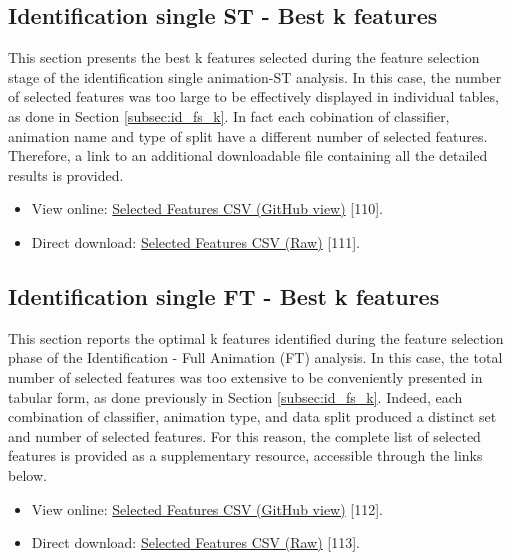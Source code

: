 \documentclass{article}
\begin{document}
\clearpage
\subsection{Identification single ST - Best k features}

This section presents the best k features selected during the feature selection stage of the identification single animation-ST analysis.
In this case, the number of selected features was too large to be effectively displayed in individual tables, as done in Section \ref{subsec:id_fs_k}.
In fact each cobination of classifier, animation name and type of split have a different number of selected features.
Therefore, a link to an additional downloadable file containing all the detailed results is provided.

\begin{itemize}
    \item View online: 
    \href{https://github.com/DavideMascheroni99/movingText/blob/main/Programs/Machine_Learning/Machine_Learning_results/Identification_single_results/selected_features_st.csv}
    {Selected Features CSV (GitHub view)} [110].
    \item Direct download: 
    \href{https://github.com/DavideMascheroni99/movingText/raw/main/Programs/Machine_Learning/Machine_Learning_results/Identification_single_results/selected_features_st.csv}
    {Selected Features CSV (Raw)} [111].
\end{itemize}

\subsection{Identification single FT - Best k features}
\label{subsec:topk_ft}

This section reports the optimal k features identified during the feature selection phase of the Identification - Full Animation (FT) analysis.
In this case, the total number of selected features was too extensive to be conveniently presented in tabular form, as done previously in Section \ref{subsec:id_fs_k}.
Indeed, each combination of classifier, animation type, and data split produced a distinct set and number of selected features.
For this reason, the complete list of selected features is provided as a supplementary resource, accessible through the links below.

\begin{itemize}
    \item View online: 
    \href{https://github.com/DavideMascheroni99/movingText/blob/main/Programs/Machine_Learning/Machine_Learning_results/Identification_single_results/selected_features_ft.csv}
    {Selected Features CSV (GitHub view)} [112].
    \item Direct download: 
    \href{https://github.com/DavideMascheroni99/movingText/raw/main/Programs/Machine_Learning/Machine_Learning_results/Identification_single_results/selected_features_ft.csv}
    {Selected Features CSV (Raw)} [113].
\end{itemize}
\end{document}
